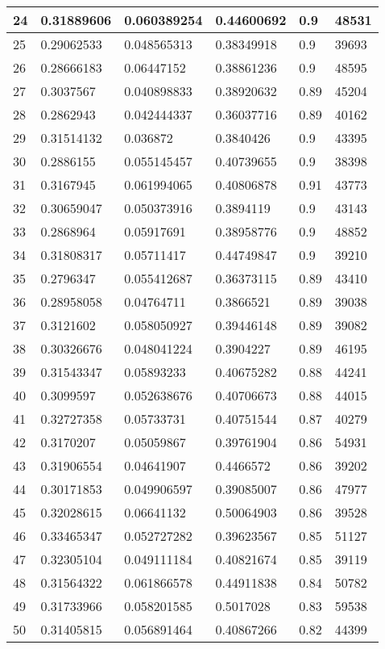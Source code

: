 \begin{longtable}{|l|l|l|l|l|l|}
24 & 0.31889606 & 0.060389254 & 0.44600692 & 0.9 & 48531 \\ \hline 
25 & 0.29062533 & 0.048565313 & 0.38349918 & 0.9 & 39693 \\ \hline 
26 & 0.28666183 & 0.06447152 & 0.38861236 & 0.9 & 48595 \\ \hline 
27 & 0.3037567 & 0.040898833 & 0.38920632 & 0.89 & 45204 \\ \hline 
28 & 0.2862943 & 0.042444337 & 0.36037716 & 0.89 & 40162 \\ \hline 
29 & 0.31514132 & 0.036872 & 0.3840426 & 0.9 & 43395 \\ \hline 
30 & 0.2886155 & 0.055145457 & 0.40739655 & 0.9 & 38398 \\ \hline 
31 & 0.3167945 & 0.061994065 & 0.40806878 & 0.91 & 43773 \\ \hline 
32 & 0.30659047 & 0.050373916 & 0.3894119 & 0.9 & 43143 \\ \hline 
33 & 0.2868964 & 0.05917691 & 0.38958776 & 0.9 & 48852 \\ \hline 
34 & 0.31808317 & 0.05711417 & 0.44749847 & 0.9 & 39210 \\ \hline 
35 & 0.2796347 & 0.055412687 & 0.36373115 & 0.89 & 43410 \\ \hline 
36 & 0.28958058 & 0.04764711 & 0.3866521 & 0.89 & 39038 \\ \hline 
37 & 0.3121602 & 0.058050927 & 0.39446148 & 0.89 & 39082 \\ \hline 
38 & 0.30326676 & 0.048041224 & 0.3904227 & 0.89 & 46195 \\ \hline 
39 & 0.31543347 & 0.05893233 & 0.40675282 & 0.88 & 44241 \\ \hline 
40 & 0.3099597 & 0.052638676 & 0.40706673 & 0.88 & 44015 \\ \hline 
41 & 0.32727358 & 0.05733731 & 0.40751544 & 0.87 & 40279 \\ \hline 
42 & 0.3170207 & 0.05059867 & 0.39761904 & 0.86 & 54931 \\ \hline 
43 & 0.31906554 & 0.04641907 & 0.4466572 & 0.86 & 39202 \\ \hline 
44 & 0.30171853 & 0.049906597 & 0.39085007 & 0.86 & 47977 \\ \hline 
45 & 0.32028615 & 0.06641132 & 0.50064903 & 0.86 & 39528 \\ \hline 
46 & 0.33465347 & 0.052727282 & 0.39623567 & 0.85 & 51127 \\ \hline 
47 & 0.32305104 & 0.049111184 & 0.40821674 & 0.85 & 39119 \\ \hline 
48 & 0.31564322 & 0.061866578 & 0.44911838 & 0.84 & 50782 \\ \hline 
49 & 0.31733966 & 0.058201585 & 0.5017028 & 0.83 & 59538 \\ \hline 
50 & 0.31405815 & 0.056891464 & 0.40867266 & 0.82 & 44399 \\ \hline 
\end{longtable}